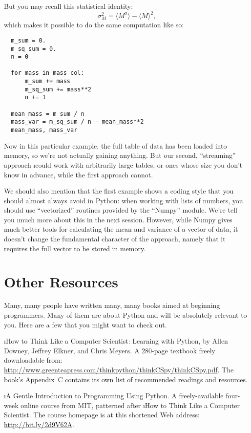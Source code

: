 \documentclass[letterpaper, 12pt, titlepage, twoside]{article}
\begin{document}
But you may recall this statistical identity:
\[
\sigma^2_M = \langle M^2\rangle - \langle M\rangle^2,
\]
which makes it possible to do the same computation like so:

\begin{lstlisting}
  m_sum = 0.
  m_sq_sum = 0.
  n = 0

  for mass in mass_col:
      m_sum += mass
      m_sq_sum += mass**2
      n += 1

  mean_mass = m_sum / n
  mass_var = m_sq_sum / n - mean_mass**2
  mean_mass, mass_var
\end{lstlisting}

Now in this particular example, the full table of data has been loaded into
memory, so we're not actually gaining anything. But our second, ``streaming''
approach \i{could} work with arbitrarily large tables, or ones whose size you
don't know in advance, while the first approach cannot.

We should also mention that the first example shows a coding style that you
should almost always avoid in Python: when working with lists of numbers, you
should use ``vectorized'' routines provided by the ``Numpy'' module. We're
tell you \i{much} more about this in the next session. However, while Numpy
gives much better tools for calculating the mean and variance of a vector of
data, it doesn't change the fundamental character of the approach, namely that
it requires the full vector to be stored in memory.


\newpage
\section*{Other Resources}

Many, many people have written many, many books aimed at beginning
programmers. Many of them are about Python and will be absolutely relevant to
you. Here are a few that you might want to check out.

\i{How to Think Like a Computer Scientist: Learning with Python}, by Allen
Downey, Jeffrey Elkner, and Chris Meyers. A 280-page textbook freely
downloadable from:
\url{http://www.greenteapress.com/thinkpython/thinkCSpy/thinkCSpy.pdf}. The
book's Appendix~C contains its own list of recommended readings and resources.

\i{A Gentle Introduction to Programming Using Python}. A freely-available
four-week online course from MIT, patterned after \i{How to Think Like a
  Computer Scientist}. The course homepage is at this shortened Web address:
\url{http://bit.ly/2d9V62A}.
\end{document}
